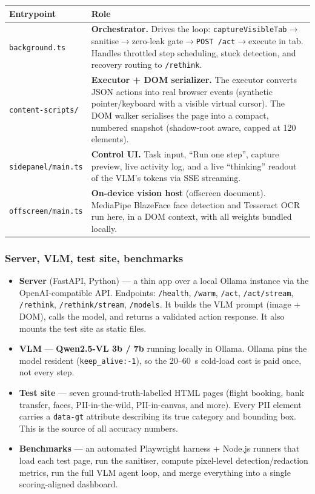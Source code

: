 \documentclass[11pt,a4paper]{article}
\newcommand{\code}[1]{\texttt{#1}}
\newcommand{\rar}{\rightarrow}
\begin{document}
\begin{table}[H]
\centering
\small
\begin{tabularx}{\textwidth}{>{\raggedright\arraybackslash}p{3.6cm} X}
\toprule
\textbf{Entrypoint} & \textbf{Role}\\
\midrule
\code{background.ts} & \textbf{Orchestrator.} Drives the loop: \code{captureVisibleTab}$\rar$sanitise$\rar$zero-leak gate$\rar$\code{POST /act}$\rar$execute in tab. Handles throttled step scheduling, stuck detection, and recovery routing to \code{/rethink}.\\
\addlinespace
\code{content-scripts/} & \textbf{Executor + DOM serializer.} The executor converts JSON actions into real browser events (synthetic pointer/keyboard with a visible virtual cursor). The DOM walker serialises the page into a compact, numbered snapshot (shadow-root aware, capped at 120 elements).\\
\addlinespace
\code{sidepanel/main.ts} & \textbf{Control UI.} Task input, ``Run one step'', capture preview, live activity log, and a live ``thinking'' readout of the VLM's tokens via SSE streaming.\\
\addlinespace
\code{offscreen/main.ts} & \textbf{On-device vision host} (offscreen document). MediaPipe BlazeFace face detection and Tesseract OCR run here, in a DOM context, with all weights bundled locally.\\
\bottomrule
\end{tabularx}
\end{table}

\subsubsection*{Server, VLM, test site, benchmarks}
\begin{itemize}
  \item \textbf{Server} (FastAPI, Python) --- a thin app over a local Ollama instance via the OpenAI-compatible API. Endpoints: \code{/health}, \code{/warm}, \code{/act}, \code{/act/stream}, \code{/rethink}, \code{/rethink/stream}, \code{/models}. It builds the VLM prompt (image + DOM), calls the model, and returns a validated action response. It also mounts the test site as static files.
  \item \textbf{VLM} --- \textbf{Qwen2.5-VL 3b / 7b} running locally in Ollama. Ollama pins the model resident (\code{keep\_alive:-1}), so the 20--60~s cold-load cost is paid once, not every step.
  \item \textbf{Test site} --- seven ground-truth-labelled HTML pages (flight booking, bank transfer, faces, PII-in-the-wild, PII-in-canvas, and more). Every PII element carries a \code{data-gt} attribute describing its true category and bounding box. This is the source of all accuracy numbers.
  \item \textbf{Benchmarks} --- an automated Playwright harness + Node.js runners that load each test page, run the sanitiser, compute pixel-level detection/redaction metrics, run the full VLM agent loop, and merge everything into a single scoring-aligned dashboard.
\end{itemize}
\end{document}
